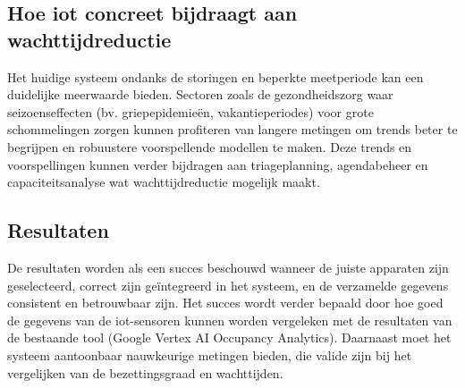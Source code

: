 



\subsection{Hoe \gls{iot} concreet bijdraagt aan wachttijdreductie}
Het huidige systeem ondanks de storingen en beperkte meetperiode kan een duidelijke meerwaarde bieden. Sectoren zoals de gezondheidszorg waar seizoenseffecten (bv. griepepidemieën, vakantieperiodes) voor grote schommelingen zorgen kunnen profiteren van langere metingen om trends beter te begrijpen en robuustere voorspellende modellen te maken. Deze trends en voorspellingen kunnen verder bijdragen aan triageplanning, agendabeheer en capaciteitsanalyse wat wachttijdreductie mogelijk maakt.


\subsection{Resultaten}
De resultaten worden als een succes beschouwd wanneer de juiste apparaten zijn geselecteerd, correct zijn geïntegreerd in het systeem, en de verzamelde gegevens consistent en betrouwbaar zijn. Het succes wordt verder bepaald door hoe goed de gegevens van de \gls{iot}-sensoren kunnen worden vergeleken met de resultaten van de bestaande tool (Google Vertex AI Occupancy Analytics). Daarnaast moet het systeem aantoonbaar nauwkeurige metingen bieden, die valide zijn bij het vergelijken van de bezettingsgraad en wachttijden. \\

